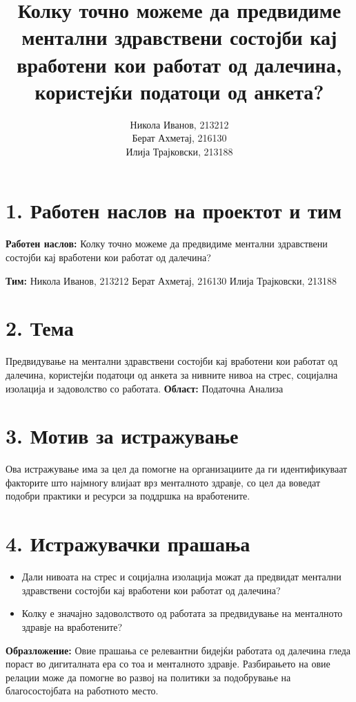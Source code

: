 \documentclass[12pt]{article}
\title{Колку точно можеме да предвидиме ментални здравствени состојби кај вработени кои работат од далечина, користејќи податоци од анкета?}
\author{
    Никола Иванов, 213212 \\ 
    Берат Ахметај, 216130 \\ 
    Илија Трајковски, 213188
}
\date{}
\begin{document}
\maketitle

\section*{1. Работен наслов на проектот и тим}
\textbf{Работен наслов:}  
Колку точно можеме да предвидиме ментални здравствени состојби кај вработени кои работат од далечина?  

\textbf{Тим:} \newline
Никола Иванов, 213212 \newline
Берат Ахметај, 216130 \newline
Илија Трајковски, 213188


\section*{2. Тема}
Предвидување на ментални здравствени состојби кај вработени кои работат од далечина, користејќи податоци од анкета за нивните нивоа на стрес, социјална изолација и задоволство со работата. \newline
\textbf{Област:} Податочна Анализа

\section*{3. Мотив за истражување}
Ова истражување има за цел да помогне на организациите да ги идентификуваат факторите што најмногу влијаат врз менталното здравје, со цел да воведат подобри практики и ресурси за поддршка на вработените.  

\section*{4. Истражувачки прашања}
\begin{itemize}
    \item Дали нивоата на стрес и социјална изолација можат да предвидат ментални здравствени состојби кај вработени кои работат од далечина?
    \item Колку е значајно задоволството од работата за предвидување на менталното здравје на вработените?
\end{itemize}

\textbf{Образложение:}  
Овие прашања се релевантни бидејќи работата од далечина гледа пораст во дигиталната ера со тоа и менталното здравје. Разбирањето на овие релации може да помогне во развој на политики за подобрување на благосостојбата на работното место.  
\end{document}
